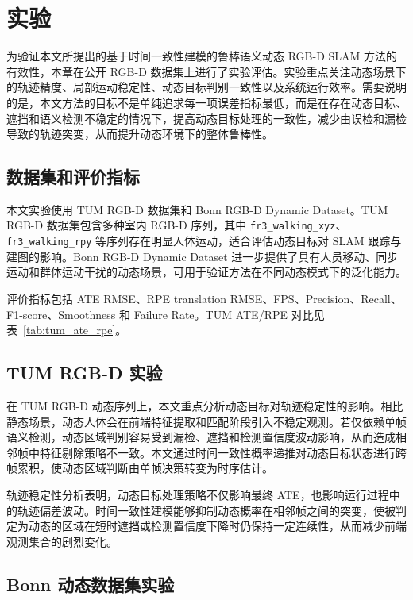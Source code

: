 \section{实验}

为验证本文所提出的基于时间一致性建模的鲁棒语义动态 RGB-D SLAM 方法的有效性，本章在公开 RGB-D 数据集上进行了实验评估。实验重点关注动态场景下的轨迹精度、局部运动稳定性、动态目标判别一致性以及系统运行效率。需要说明的是，本文方法的目标不是单纯追求每一项误差指标最低，而是在存在动态目标、遮挡和语义检测不稳定的情况下，提高动态目标处理的一致性，减少由误检和漏检导致的轨迹突变，从而提升动态环境下的整体鲁棒性。

\subsection{数据集和评价指标}

本文实验使用 TUM RGB-D 数据集和 Bonn RGB-D Dynamic Dataset。TUM RGB-D 数据集包含多种室内 RGB-D 序列，其中 \texttt{fr3\_walking\_xyz}、\texttt{fr3\_walking\_rpy} 等序列存在明显人体运动，适合评估动态目标对 SLAM 跟踪与建图的影响。Bonn RGB-D Dynamic Dataset 进一步提供了具有人员移动、同步运动和群体运动干扰的动态场景，可用于验证方法在不同动态模式下的泛化能力。

评价指标包括 ATE RMSE、RPE translation RMSE、FPS、Precision、Recall、F1-score、Smoothness 和 Failure Rate。TUM ATE/RPE 对比见表~\ref{tab:tum_ate_rpe}。



\subsection{TUM RGB-D 实验}

在 TUM RGB-D 动态序列上，本文重点分析动态目标对轨迹稳定性的影响。相比静态场景，动态人体会在前端特征提取和匹配阶段引入不稳定观测。若仅依赖单帧语义检测，动态区域判别容易受到漏检、遮挡和检测置信度波动影响，从而造成相邻帧中特征剔除策略不一致。本文通过时间一致性概率递推对动态目标状态进行跨帧累积，使动态区域判断由单帧决策转变为时序估计。

轨迹稳定性分析表明，动态目标处理策略不仅影响最终 ATE，也影响运行过程中的轨迹偏差波动。时间一致性建模能够抑制动态概率在相邻帧之间的突变，使被判定为动态的区域在短时遮挡或检测置信度下降时仍保持一定连续性，从而减少前端观测集合的剧烈变化。

\subsection{Bonn 动态数据集实验}

